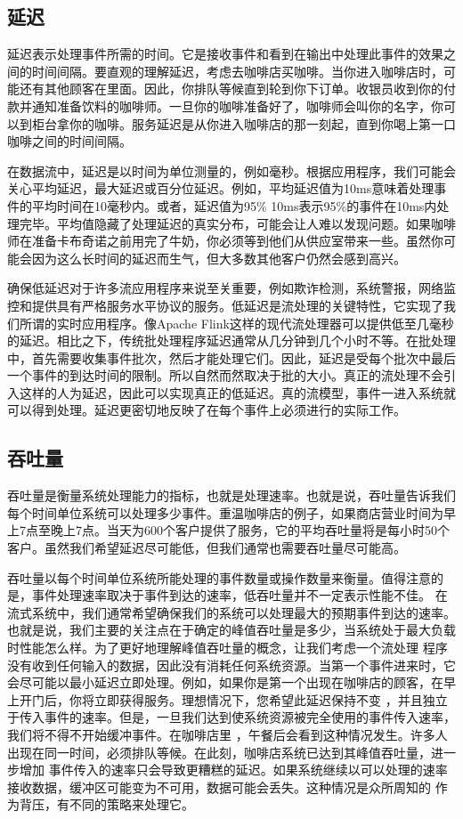 \documentclass[oneside]{ctexbook}
\begin{document}
\subsection{延迟}

延迟表示处理事件所需的时间。它是接收事件和看到在输出中处理此事件的效果之间的时间间隔。要直观的理解延迟，考虑去咖啡店买咖啡。当你进入咖啡店时，可能还有其他顾客在里面。因此，你排队等候直到轮到你下订单。收银员收到你的付款并通知准备饮料的咖啡师。一旦你的咖啡准备好了，咖啡师会叫你的名字，你可以到柜台拿你的咖啡。服务延迟是从你进入咖啡店的那一刻起，直到你喝上第一口咖啡之间的时间间隔。

在数据流中，延迟是以时间为单位测量的，例如毫秒。根据应用程序，我们可能会关心平均延迟，最大延迟或百分位延迟。例如，平均延迟值为10ms意味着处理事件的平均时间在10毫秒内。或者，延迟值为95\% 10ms表示95\%的事件在10ms内处理完毕。平均值隐藏了处理延迟的真实分布，可能会让人难以发现问题。如果咖啡师在准备卡布奇诺之前用完了牛奶，你必须等到他们从供应室带来一些。虽然你可能会因为这么长时间的延迟而生气，但大多数其他客户仍然会感到高兴。

确保低延迟对于许多流应用程序来说至关重要，例如欺诈检测，系统警报，网络监控和提供具有严格服务水平协议的服务。低延迟是流处理的关键特性，它实现了我们所谓的实时应用程序。像Apache Flink这样的现代流处理器可以提供低至几毫秒的延迟。相比之下，传统批处理程序延迟通常从几分钟到几个小时不等。在批处理中，首先需要收集事件批次，然后才能处理它们。因此，延迟是受每个批次中最后一个事件的到达时间的限制。所以自然而然取决于批的大小。真正的流处理不会引入这样的人为延迟，因此可以实现真正的低延迟。真的流模型，事件一进入系统就可以得到处理。延迟更密切地反映了在每个事件上必须进行的实际工作。

\subsection{吞吐量}

吞吐量是衡量系统处理能力的指标，也就是处理速率。也就是说，吞吐量告诉我们每个时间单位系统可以处理多少事件。重温咖啡店的例子，如果商店营业时间为早上7点至晚上7点。当天为600个客户提供了服务，它的平均吞吐量将是每小时50个客户。虽然我们希望延迟尽可能低，但我们通常也需要吞吐量尽可能高。

吞吐量以每个时间单位系统所能处理的事件数量或操作数量来衡量。值得注意的是，事件处理速率取决于事件到达的速率，低吞吐量并不一定表示性能不佳。
在流式系统中，我们通常希望确保我们的系统可以处理最大的预期事件到达的速率。也就是说，我们主要的关注点在于确定的峰值吞吐量是多少，当系统处于最大负载时性能怎么样。为了更好地理解峰值吞吐量的概念，让我们考虑一个流处理
程序没有收到任何输入的数据，因此没有消耗任何系统资源。当第一个事件进来时，它会尽可能以最小延迟立即处理。例如，如果你是第一个出现在咖啡店的顾客，在早上开门后，你将立即获得服务。理想情况下，您希望此延迟保持不变
，并且独立于传入事件的速率。但是，一旦我们达到使系统资源被完全使用的事件传入速率，我们将不得不开始缓冲事件。在咖啡店里
，午餐后会看到这种情况发生。许多人出现在同一时间，必须排队等候。在此刻，咖啡店系统已达到其峰值吞吐量，进一步增加
事件传入的速率只会导致更糟糕的延迟。如果系统继续以可以处理的速率接收数据，缓冲区可能变为不可用，数据可能会丢失。这种情况是众所周知的
作为背压，有不同的策略来处理它。
\end{document}
